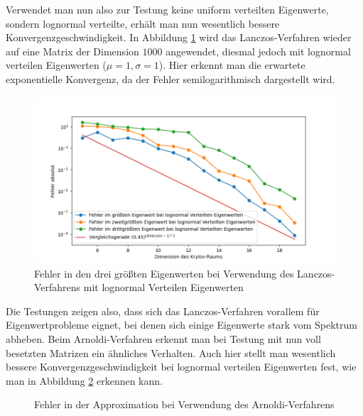\documentclass{article}
\theoremstyle{plain}
\begin{document}
Verwendet man nun also zur Testung keine uniform verteilten Eigenwerte, sondern lognormal verteilte, erhält man nun wesentlich bessere Konvergenzgeschwindigkeit. In Abbildung \ref{lanczos_lognormal} wird das Lanczos-Verfahren wieder auf eine Matrix der Dimension $1000$ angewendet, diesmal jedoch mit lognormal verteilen Eigenwerten ($\mu = 1, \sigma = 1$). Hier erkennt man die erwartete exponentielle Konvergenz, da der Fehler semilogarithmisch dargestellt wird.

\begin{figure}[H]
	\centering
	\includegraphics[width = 0.7 \linewidth]{Plots/lanczos_lognormal}
	\caption{Fehler in den drei größten Eigenwerten bei Verwendung des Lanczos-Verfahrens mit lognormal Verteilen Eigenwerten}
	\label{lanczos_lognormal}
\end{figure}


Die Testungen zeigen also, dass sich das Lanczos-Verfahren vorallem für Eigenwertprobleme eignet, bei denen sich einige Eigenwerte stark vom Spektrum abheben. Beim Arnoldi-Verfahren erkennt man bei Testung mit nun voll besetzten Matrizen ein ähnliches Verhalten. Auch hier stellt man wesentlich bessere Konvergenzgeschwindigkeit bei lognormal verteilen Eigenwerten fest, wie man in Abbildung \ref{Arnoldi_error} erkennen kann.

\begin{figure}[H]
  \centering
  \qquad
  \caption{Fehler in der Approximation bei Verwendung des Arnoldi-Verfahrens}%
  \label{Arnoldi_error}
\end{figure}
\end{document}
